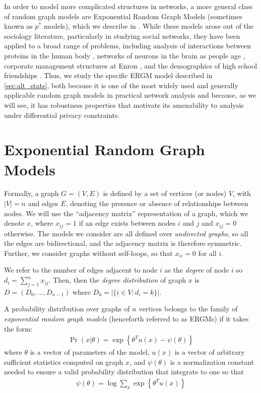 In order to model more complicated structures in networks, a more general class of random graph models are Exponential Random Graph Models (sometimes known as $p^*$ models), which we describe in .  While these models arose out of the sociology literature, particularly in studying social networks, they have been applied to a broad range of problems, including analysis of interactions between proteins in the human body \cite{EBB10}, networks of neurons in the brain as people age  \cite{Sin+16}, corporate management structures at Enron  \cite{UHH13}, and the demographics of high school friendships \cite{GKM09}. Thus, we study the specific ERGM model described in \ref{sec:alt_stats}, both because it is one of the most widely used and generally applicable random graph models in practical network analysis and because, as we will see, it has robustness properties that motivate its amenability to analysis under differential privacy constraints.

\section{Exponential Random Graph Models}\label{sec:ergms}

Formally, a graph $G = (V,E)$ is defined by a set of vertices (or nodes) $V$, with $|V| = n$ and edges $E$, denoting the presence or absence of relationships between nodes. We will use the ``adjacency matrix'' representation of a graph, which we denote $x$, where $x_{ij} = 1$ if an edge exists between nodes $i$ and $j$ and $x_{ij} = 0$ otherwise.  The models we consider are all defined over \emph{undirected graphs}, so all the edges are bidirectional, and the adjacency matrix is therefore symmetric. Further, we consider graphs without self-loops, so that $x_{ii} = 0$ for all $i$.

 We refer to the number of edges adjacent to node $i$ as the \emph{degree} of node $i$ so $d_i = \sum_{j=1}^{n} x_{ij}$. Then, then the \emph{degree distribution} of graph $x$ is $D = (D_0,...,D_{n-1})$ where $D_k = |\{i \in V : d_i = k \}|$.

\begin{definition}
\label{def:ergm_defn}
A probability distribution over graphs of $n$ vertices belongs to the family of \emph{exponential random graph models} (henceforth referred to as ERGMs) if it takes the form:
\begin{align*}
\Pr(x | \theta) = \exp\left\{\theta^T u(x) - \psi(\theta)  \right\}
\end{align*}
where $\theta$ is a vector of parameters of the model, $u(x)$ is a vector of arbitrary sufficient statistics computed on graph $x$, and $\psi(\theta)$ is a normalization constant needed to ensure a valid probability distribution that integrate to one so that
\begin{align*}
\psi(\theta) = \log \sum_x \exp\left\{\theta^T u(x) \right\}
\end{align*}
\end{definition}

